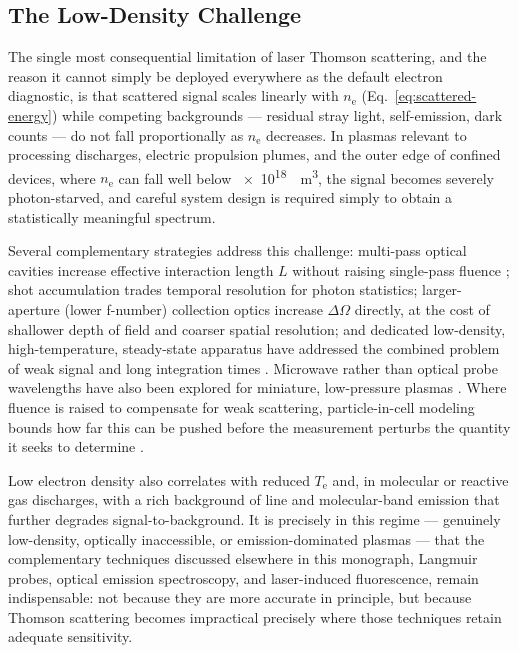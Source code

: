 \subsection{The Low-Density Challenge}
\label{sec:low-density-challenge}

The single most consequential limitation of laser Thomson scattering, and the reason it cannot simply be deployed everywhere as the default electron diagnostic, is that scattered signal scales linearly with $n_{\mathrm{e}}$ (Eq.~\eqref{eq:scattered-energy}) while competing backgrounds — residual stray light, self-emission, dark counts — do not fall proportionally as $n_{\mathrm{e}}$ decreases. In plasmas relevant to processing discharges, electric propulsion plumes, and the outer edge of confined devices, where $n_{\mathrm{e}}$ can fall well below \SI{e18}{\per\cubic\meter}, the signal becomes severely photon-starved, and careful system design is required simply to obtain a statistically meaningful spectrum.

Several complementary strategies address this challenge: multi-pass optical cavities increase effective interaction length $L$ without raising single-pass fluence \cite{ref0357}; shot accumulation trades temporal resolution for photon statistics; larger-aperture (lower f-number) collection optics increase $\Delta\Omega$ directly, at the cost of shallower depth of field and coarser spatial resolution; and dedicated low-density, high-temperature, steady-state apparatus have addressed the combined problem of weak signal and long integration times \cite{ref0383}. Microwave rather than optical probe wavelengths have also been explored for miniature, low-pressure plasmas \cite{ref0362}. Where fluence is raised to compensate for weak scattering, particle-in-cell modeling bounds how far this can be pushed before the measurement perturbs the quantity it seeks to determine \cite{ref0360}.

Low electron density also correlates with reduced $T_{\mathrm{e}}$ and, in molecular or reactive gas discharges, with a rich background of line and molecular-band emission that further degrades signal-to-background. It is precisely in this regime — genuinely low-density, optically inaccessible, or emission-dominated plasmas — that the complementary techniques discussed elsewhere in this monograph, Langmuir probes, optical emission spectroscopy, and laser-induced fluorescence, remain indispensable: not because they are more accurate in principle, but because Thomson scattering becomes impractical precisely where those techniques retain adequate sensitivity.


